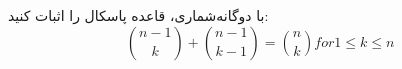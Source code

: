     \p 
با دوگانه‌شماری، قاعده پاسکال را اثبات کنید:
$$\binom{n-1}{k} + \binom{n-1}{k-1} = \binom{n}{k} for 1 \leq k \leq n$$